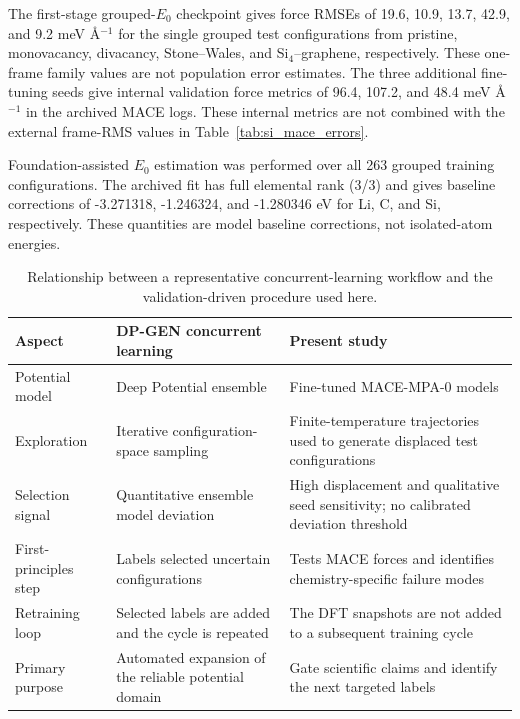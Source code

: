 \documentclass[11pt]{article}
\begin{document}
The first-stage grouped-$E_0$ checkpoint gives force RMSEs of 19.6, 10.9,
13.7, 42.9, and 9.2 meV \AA$^{-1}$ for the single grouped test configurations
from pristine, monovacancy, divacancy, Stone--Wales, and Si$_4$--graphene,
respectively. These one-frame family values are not population error estimates.
The three additional fine-tuning seeds give internal validation force metrics
of 96.4, 107.2, and 48.4 meV \AA$^{-1}$ in the archived MACE logs. These internal
metrics are not combined with the external frame-RMS values in
Table~\ref{tab:si_mace_errors}.

Foundation-assisted $E_0$ estimation was performed over all 263 grouped
training configurations. The archived fit has full elemental rank (3/3) and
gives baseline corrections of -3.271318, -1.246324, and -1.280346 eV for Li,
C, and Si, respectively. These quantities are model baseline corrections, not
isolated-atom energies.

\begin{table}[H]
  \centering
  \footnotesize
  \caption{Relationship between a representative concurrent-learning workflow
  and the validation-driven procedure used here.}
  \label{tab:si_concurrent_learning}
  \begin{tabular}{p{2.5cm}p{5.0cm}p{6.0cm}}
    \toprule
    Aspect & DP-GEN concurrent learning & Present study \\
    \midrule
    Potential model & Deep Potential ensemble & Fine-tuned MACE-MPA-0 models \\
    Exploration & Iterative configuration-space sampling & Finite-temperature
    trajectories used to generate displaced test configurations \\
    Selection signal & Quantitative ensemble model deviation & High displacement
    and qualitative seed sensitivity; no calibrated deviation threshold \\
    First-principles step & Labels selected uncertain configurations & Tests MACE
    forces and identifies chemistry-specific failure modes \\
    Retraining loop & Selected labels are added and the cycle is repeated & The DFT
    snapshots are not added to a subsequent training cycle \\
    Primary purpose & Automated expansion of the reliable potential domain & Gate
    scientific claims and identify the next targeted labels \\
    \bottomrule
  \end{tabular}
\end{table}
\end{document}
